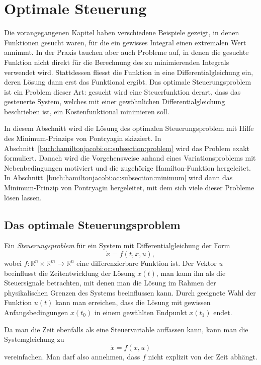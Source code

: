 %
%
%
\section{Optimale Steuerung
\label{buch:hamiltonjacobi:section:oc}}
Die vorangegangenen Kapitel haben verschiedene Beispiele gezeigt,
in denen Funktionen gesucht waren, für die ein gewisses Integral
einen extremalen Wert annimmt.
In der Praxis tauchen aber auch Probleme auf, in denen die
gesuchte Funktion nicht direkt für die Berechnung des zu minimierenden
Integrals verwendet wird.
Stattdessen fliesst die Funktion in eine Differentialgleichung
ein, deren Lösung dann erst das Funktional ergibt.
Das optimale Steuerungsproblem ist ein Problem dieser Art: gesucht
wird eine Steuerfunktion derart, dass das gesteuerte System, welches
mit einer gewöhnlichen Differentialgleichung beschrieben ist, ein
Kostenfunktional minimieren soll.

In diesem Abschnitt wird die Lösung des optimalen Steuerungsproblem
mit Hilfe des Minimum-Prinzips von Pontryagin skizziert.
In Abschnitt~\ref{buch:hamiltonjacobi:oc:subsection:problem}
wird das Problem exakt formuliert.
Danach wird die Vorgehensweise anhand eines Variationsproblems
mit Nebenbedingungen motiviert und die zugehörige Hamilton-Funktion
hergeleitet.
In Abschnitt~\ref{buch:hamiltonjacobi:oc:subsection:minimum}
wird dann das Minimum-Prinzip von Pontryagin hergeleitet, mit dem
sich viele dieser Probleme lösen lassen.

%
%
\subsection{Das optimale Steuerungsproblem
\label{buch:hamiltonjacobi:oc:subsection:problem}}
Ein {\em Steuerungsproblem} für ein System mit Differentialgleichung
der Form
\[
\dot{x}
=
f(t, x, u),
\]
wobei $f\colon\mathbb{R}^n\times\mathbb{R}^m\to\mathbb{R}^n$
eine differenzierbare Funktion ist.
Der Vektor $u$ beeinflusst die Zeitentwicklung der Lösung $x(t)$, man
kann ihn als die Steuersignale betrachten, mit denen man die Lösung
im Rahmen der physikalischen Grenzen des Systems beeinflussen kann.
Durch geeignete Wahl der Funktion $u(t)$ kann man erreichen, dass 
die Lösung mit gewissen Anfangsbedingungen $x(t_0)$ in einem
gewählten Endpunkt $x(t_1)$ endet.

Da man die Zeit ebenfalls als eine Steuervariable auffassen kann, 
kann man die Systemgleichung zu
\begin{equation*}
\dot{x}
=
f(x,u)
\end{equation*}
vereinfachen.
Man darf also annehmen, dass $f$ nicht explizit von der Zeit
abhängt.

